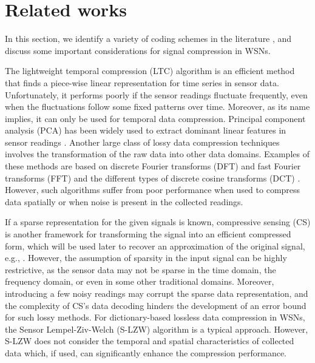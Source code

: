 \documentclass[a4paper,onecolumn,conference]{IEEEtran}
\begin{document}
\section{Related works}\label{sec:related}

In this section, we identify a variety of coding schemes in the literature \cite{Srisooksai201237,zordan2012compress,razzaque2013compression}, and discuss some important considerations for signal compression in WSNs.

The lightweight temporal compression (LTC) algorithm \cite{schoellhammer2004lightweight} is an efficient method that finds a piece-wise linear representation for time series in sensor data. Unfortunately, it performs poorly if the sensor readings fluctuate frequently, even when the fluctuations follow some fixed patterns over time. Moreover, as its name implies, it can only be used for temporal data compression. Principal component analysis (PCA) has been widely used to extract dominant linear features in sensor readings \cite{rooshenas2010reducing}. Another large class of lossy data compression techniques involves the transformation of the raw data into other data domains. Examples of these methods are based on discrete Fourier transforms (DFT) and fast Fourier transforms (FFT) \cite{zordan2012compress} and the different types of discrete cosine transforms (DCT) \cite{quer2009interplay}. However, such algorithms suffer from poor performance when used to compress data spatially or when noise is present in the collected readings.

If a sparse representation for the given signals is known, compressive sensing (CS) is another framework for transforming the signal into an efficient compressed form, which will be used later to recover an approximation of the original signal, e.g., \cite{xiang2011compressed}. However, the assumption of sparsity in the input signal can be highly restrictive, as the sensor data may not be sparse in the time domain, the frequency domain, or even in some other traditional domains. Moreover, introducing a few noisy readings may corrupt the sparse data representation, and the complexity of CS's data decoding hinders the development of an error bound for such lossy methods. For dictionary-based lossless data compression in WSNs, the Sensor Lempel-Ziv-Welch (S-LZW) algorithm \cite{sadler2006data} is a typical approach. However, S-LZW does not consider the temporal and spatial characteristics of collected data which, if used, can significantly enhance the compression performance.
\end{document}
